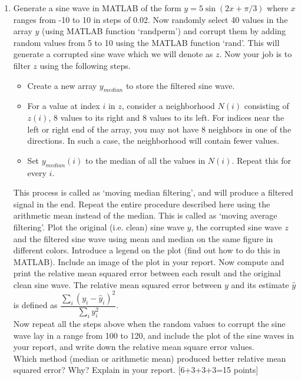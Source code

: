 \documentclass[11pt]{article}
\begin{document}
\begin{enumerate}
\item Generate a sine wave in MATLAB of the form $y = 5 \sin (2x + \pi/3)$ where $x$ ranges from -10 to 10 in steps of 0.02. Now randomly select 40 values in the array $y$ (using MATLAB function `randperm') and corrupt them by adding random values from 5 to 10 using the MATLAB function `rand'. This will generate a corrupted sine wave which we will denote as $z$. Now your job is to filter $z$ using the following steps. 
\begin{itemize}
\item Create a new array $y_{median}$ to store the filtered sine wave.
\item For a value at index $i$ in $z$, consider a neighborhood $N(i)$ consisting of $z(i)$, 8 values to its right and 8 values to its left. For indices near the left or right end of the array, you may not have 8 neighbors in one of the directions. In such a case, the neighborhood will contain fewer values.
\item Set $y_{median}(i)$ to the median of all the values in $N(i)$. Repeat this for every $i$. 
\end{itemize}
This process is called as `moving median filtering', and will produce a filtered signal in the end. Repeat the entire procedure described here using the arithmetic mean instead of the median. This is called as `moving average filtering'. Plot the original (i.e. clean) sine wave $y$, the corrupted sine wave $z$ and the filtered sine wave using mean and median on the same figure in different colors. Introduce a legend on the plot (find out how to do this in MATLAB). Include an image of the plot in your report. Now compute and print the relative mean squared error between each result and the original clean sine wave. 
The relative mean squared error between $y$ and its estimate $\hat{y}$ is defined as $\dfrac{\sum_i (y_i-\hat{y}_i)^2}{\sum_i y^2_i}$. \\
Now repeat all the steps above when the random values to corrupt the sine wave lay in a range from 100 to 120, and include the plot of the sine waves in your report, and write down the relative mean square error values. \\
Which method (median or arithmetic mean) produced better relative mean squared error? Why? Explain in your report. \textsf{[6+3+3+3=15 points]}


\end{enumerate}
\end{document}
